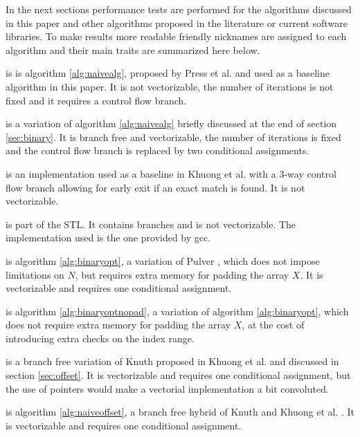 \documentclass[preprint,1p,times]{elsarticle}
\newcounter{subsubsubsection}[subsubsection]
\begin{document}
In the next sections performance tests are performed for the algorithms discussed in this paper and other algorithms proposed in the literature or current software libraries. To make results more readable friendly nicknames are assigned to each algorithm and their main traits are summarized here below.
	\begin{myitemize}
		\item \textit{\ClassicName} is is algorithm \ref{alg:naivealg}, proposed by Press et al. \cite{NRC++} and used as a baseline algorithm in this paper. It is not vectorizable, the number of iterations is not fixed and it requires a control flow branch.
		\item \textit{\ClassicModName} is a variation of algorithm \ref{alg:naivealg} briefly discussed at the end of section \ref{sec:binary}. It is branch free and vectorizable, the number of iterations is fixed and the control flow branch is replaced by two conditional assignments.
		\item \textit{\MorinBranchyName} is an implementation used as a baseline in Khuong et al. \cite{Morin2015} with a 3-way  control flow branch allowing for early exit if an exact match is found. It is not vectorizable.
		\item \textit{\LowerBoundName} is part of the STL. It contains branches and is not vectorizable. The implementation used is the one provided by gcc. 
		\item \textit{\BitSetName} is algorithm \ref{alg:binaryopt}, a variation of Pulver \cite{Pulver2011}, which does not impose limitations on $N$, but requires extra memory for padding the array $X$. It is vectorizable and requires one conditional assignment. 
		\item \textit{\BitSetNoPadName} is algorithm \ref{alg:binaryoptnopad}, a variation of algorithm \ref{alg:binaryopt}, which does not require extra memory for padding the array $X$, at the cost of introducing extra checks on the index range.		
		\item \textit{\MorinOffsetName} is a branch free variation of Knuth \cite{Knuth1997} proposed in Khuong et al. \cite{Morin2015} and discussed in section \ref{sec:offset}. It is vectorizable and requires one conditional assignment, but the use of pointers would make a vectorial implementation a bit convoluted.
		\item \textit{\ClassicOffsetName} is algorithm \ref{alg:naiveoffset}, a branch free hybrid of Knuth \cite{Knuth1997} and Khuong et al. \cite{Morin2015}. It is vectorizable and requires one conditional assignment.

\end{myitemize}
\end{document}
